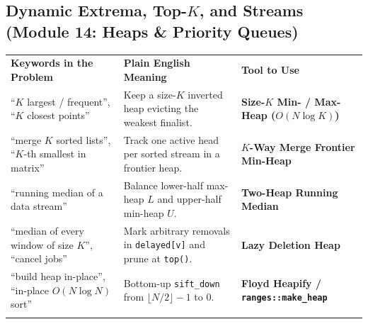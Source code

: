 \documentclass[11pt,a4paper]{article}
\begin{document}
\subsection{Dynamic Extrema, Top-$K$, and Streams (Module 14: Heaps \& Priority Queues)}
\begingroup\footnotesize{}
\begin{tabularx}{\textwidth}{>{\raggedright\arraybackslash}p{4.4cm} >{\raggedright\arraybackslash}X >{\raggedright\arraybackslash\bfseries}p{4.0cm}}
\arrayrulecolor{primaryblue}\toprule[1.1pt]
\rowcolor{primaryblue!10}
\textcolor{primaryblue}{\textbf{Keywords in the Problem}} & \textcolor{primaryblue}{\textbf{Plain English Meaning}} & \textcolor{primaryblue}{\textbf{Tool to Use}} \\
\arrayrulecolor{codeframe}\midrule[0.6pt]
``$K$ largest / frequent'', ``$K$ closest points'' & Keep a size-$K$ inverted heap evicting the weakest finalist. & Size-$K$ Min- / Max-Heap ($O(N \log K)$) \\
``merge $K$ sorted lists'', ``$K$-th smallest in matrix'' & Track one active head per sorted stream in a frontier heap. & $K$-Way Merge Frontier Min-Heap \\
``running median of a data stream'' & Balance lower-half max-heap $L$ and upper-half min-heap $U$. & Two-Heap Running Median \\
``median of every window of size $K$'', ``cancel jobs'' & Mark arbitrary removals in \texttt{delayed[v]} and prune at \texttt{top()}. & Lazy Deletion Heap \\
``build heap in-place'', ``in-place $O(N \log N)$ sort'' & Bottom-up \texttt{sift\_down} from $\lfloor N/2 \rfloor - 1$ to $0$. & Floyd Heapify / \texttt{ranges::make\_heap} \\
\arrayrulecolor{primaryblue}\bottomrule[1.1pt]
\end{tabularx}\endgroup
\end{document}
